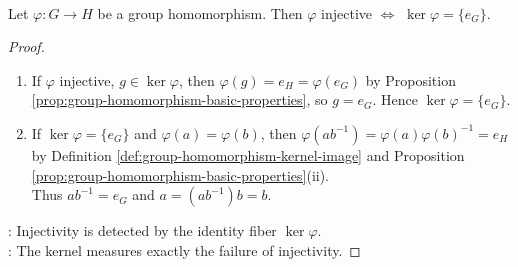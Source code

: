 \begin{proposition} \label{prop:group-homomorphism-injective-kernel} \\
Let $\varphi:G\to H$ be a group homomorphism. Then $\varphi$ injective $\iff$ $\ker\varphi=\{e_G\}$.
\begin{proof}
\begin{enumerate}[label=\roman*.]
\setlength{\itemsep}{0pt}
\item[$(\Rightarrow)$] If $\varphi$ injective, $g\in\ker\varphi$, then $\varphi(g)=e_H=\varphi(e_G)$ by Proposition \ref{prop:group-homomorphism-basic-properties}, so $g=e_G$. Hence $\ker\varphi=\{e_G\}$.
\item[$(\Leftarrow)$] If $\ker\varphi=\{e_G\}$ and $\varphi(a)=\varphi(b)$, then $\varphi(ab^{-1})=\varphi(a)\varphi(b)^{-1}=e_H$ by Definition \ref{def:group-homomorphism-kernel-image} and Proposition \ref{prop:group-homomorphism-basic-properties}(ii).\\
Thus $ab^{-1}=e_G$ and $a=(ab^{-1})b=b$.
\end{enumerate}
: Injectivity is detected by the identity fiber $\ker\varphi$.\\
: The kernel measures exactly the failure of injectivity.
\end{proof}
\end{proposition}
